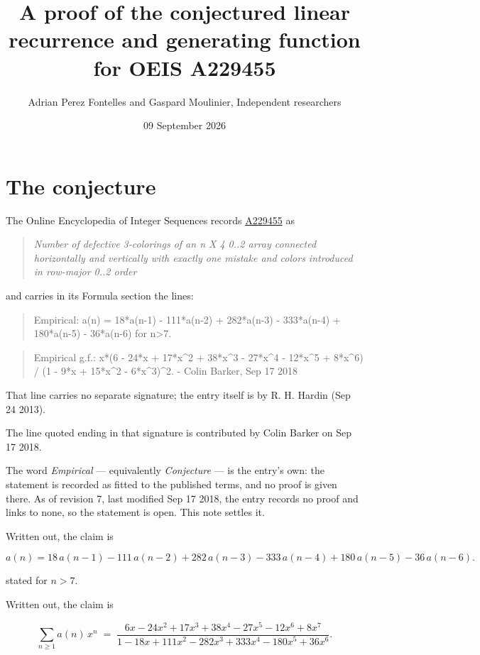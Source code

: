 \documentclass[11pt]{article}
\title{A proof of the conjectured linear recurrence and generating function for OEIS A229455}
\author{Adrian Perez Fontelles and Gaspard Moulinier, Independent researchers}
\date{09 September 2026}
\theoremstyle{definition}
\begin{document}
\maketitle
\section{The conjecture}

The Online Encyclopedia of Integer Sequences records \href{https://oeis.org/A229455}{A229455} as

\begin{quote}\itshape Number of defective 3-colorings of an n X 4 0..2 array connected horizontally and vertically with exactly one mistake and colors introduced in row-major 0..2 order\end{quote}

and carries in its Formula section the lines:

\begin{quote}\ttfamily Empirical: a(n) = 18*a(n-1) - 111*a(n-2) + 282*a(n-3) - 333*a(n-4) + 180*a(n-5) - 36*a(n-6) for n>7.\end{quote}

\begin{quote}\ttfamily Empirical g.f.: x*(6 - 24*x + 17*x\textasciicircum{}2 + 38*x\textasciicircum{}3 - 27*x\textasciicircum{}4 - 12*x\textasciicircum{}5 + 8*x\textasciicircum{}6) / (1 - 9*x + 15*x\textasciicircum{}2 - 6*x\textasciicircum{}3)\textasciicircum{}2. - Colin Barker, Sep 17 2018\end{quote}

That line carries no separate signature; the entry itself is by R. H. Hardin (Sep 24 2013).

The line quoted ending in that signature is contributed by Colin Barker on Sep 17 2018.

The word {\itshape Empirical} --- equivalently {\itshape Conjecture} --- is the entry's own: the statement is recorded as fitted to the published terms, and no proof is given there. As of revision 7, last modified Sep 17 2018, the entry records no proof and links to none, so the statement is open. This note settles it.

Written out, the claim is

\[a(n) = 18\,a(n-1) - 111\,a(n-2) + 282\,a(n-3) - 333\,a(n-4) + 180\,a(n-5) - 36\,a(n-6).\]

stated for $n > 7$.

Written out, the claim is

\[\sum_{n \ge 1} a(n)\,x^n \;=\; \frac{6x - 24x^{2} + 17x^{3} + 38x^{4} - 27x^{5} - 12x^{6} + 8x^{7}}{1 - 18x + 111x^{2} - 282x^{3} + 333x^{4} - 180x^{5} + 36x^{6}}.\]
\end{document}

